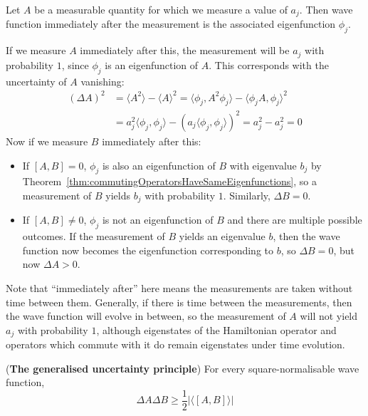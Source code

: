\begin{example}
	Let $A$ be a measurable quantity for which we measure a value of $a_j$. Then wave function immediately after the measurement is the associated eigenfunction $\phi_j$.

	If we measure $A$ immediately after this, the measurement will be $a_j$ with probability $1$, since $\phi_j$ is an eigenfunction of $A$. This corresponds with the uncertainty of $A$ vanishing:
	\[
		\begin{aligned}
			{(\Delta A)}^2 & = \langle A^2 \rangle - {\langle A \rangle}^2 = \langle \phi_j, A^2 \phi_j \rangle - {\langle \phi_j A, \phi_j \rangle}^2 \\
			& = a_j^2 \langle \phi_j, \phi_j \rangle - {(a_j \langle \phi_j, \phi_j \rangle)}^2 = a_j^2 - a_j^2 = 0
		\end{aligned}
	\]
	Now if we measure $B$ immediately after this:
	\begin{itemize}
		\item If $[A, B] = 0$, $\phi_j$ is also an eigenfunction of $B$ with eigenvalue $b_j$ by Theorem~\ref{thm:commutingOperatorsHaveSameEigenfunctions}, so a measurement of $B$ yields $b_j$ with probability $1$. Similarly, $\Delta B = 0$.
		\item If $[A, B] \ne 0$, $\phi_j$ is not an eigenfunction of $B$ and there are multiple possible outcomes. If the measurement of $B$ yields an eigenvalue $b$, then the wave function now becomes the eigenfunction corresponding to $b$, so $\Delta B = 0$, but now $\Delta A > 0$.
	\end{itemize}
\end{example}

\begin{remark}
	Note that ``immediately after'' here means the measurements are taken without time between them. Generally, if there is time between the measurements, then the wave function will evolve in between, so the measurement of $A$ will not yield $a_j$ with probability $1$, although eigenstates of the Hamiltonian operator and operators which commute with it do remain eigenstates under time evolution.
\end{remark}

\begin{theorem}
	(\textbf{The generalised uncertainty principle}) For every square-normalisable wave function,
	\[
		\Delta A \Delta B \ge \frac{1}{2} | \langle [A, B] \rangle |
	\]
\end{theorem}

